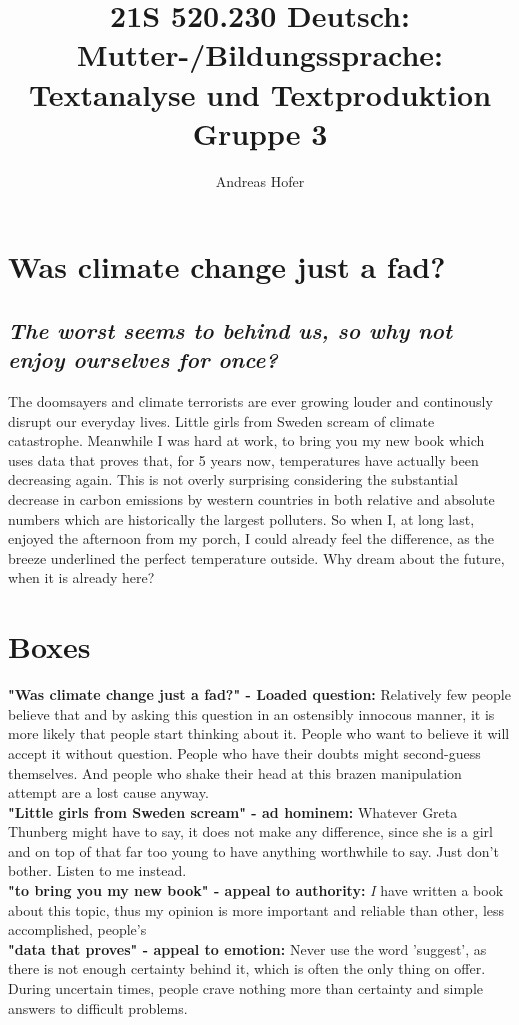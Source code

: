 \documentclass{article}
\title{\vspace{-3cm}21S 520.230 Deutsch: Mutter-/Bildungssprache: Textanalyse und Textproduktion Gruppe 3}
\author{Andreas Hofer}
\begin{document}
	\section*{Was climate change just a fad?} 
	\subsection*{\textit{The worst seems to behind us, so why not enjoy ourselves for once?}}
	\Large
	The doomsayers and climate terrorists are ever growing louder and continously disrupt our everyday lives. Little girls from Sweden scream of climate catastrophe. Meanwhile I was hard at work, to bring you my new book which uses data that proves that, for 5 years now, temperatures have actually been decreasing again. This is not overly surprising considering the substantial decrease in carbon emissions by western countries in both relative and absolute numbers which are historically the largest polluters. So when I, at long last, enjoyed the afternoon from my porch, I could already feel the difference, as the breeze underlined the perfect temperature outside. Why dream about the future, when it is already here?

	\normalsize
{}
	\newpage
	\section*{Boxes}
	\textbf{"Was climate change just a fad?" - Loaded question:} Relatively few people believe that and by asking this question in an ostensibly innocous manner, it is more likely that people start thinking about it. People who want to believe it will accept it without question. People who have their doubts might second-guess themselves. And people who shake their head at this brazen manipulation attempt are a lost cause anyway. \\

	\textbf{"Little girls from Sweden scream" - ad hominem:} Whatever Greta Thunberg might have to say, it does not make any difference, since she is a girl and on top of that far too young to have anything worthwhile to say. Just don't bother. Listen to me instead. \\

	\textbf{"to bring you my new book" - appeal to authority:} \textit{I} have written a book about this topic, thus my opinion is more important and reliable than other, less accomplished, people's\\

	\textbf{"data that proves" - appeal to emotion:} Never use the word 'suggest', as there is not enough certainty behind it, which is often the only thing on offer. During uncertain times, people crave nothing more than certainty and simple answers to difficult problems. \\
\end{document}
